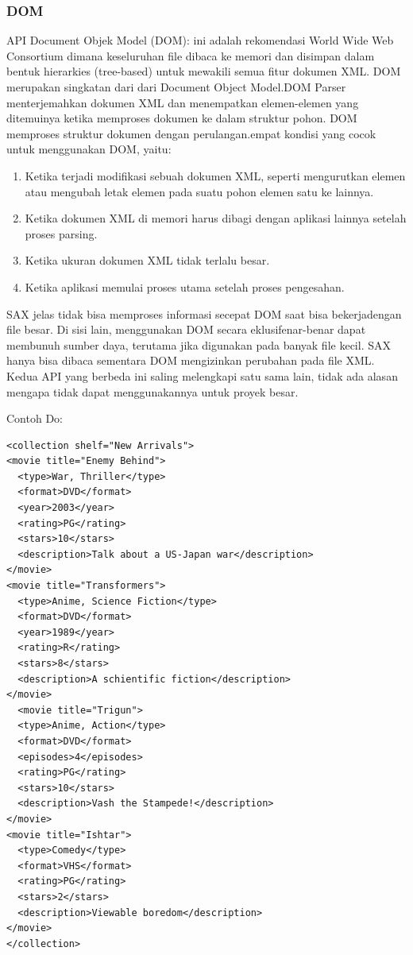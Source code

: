\subsubsection {DOM}
  API Document Objek Model (DOM): ini adalah rekomendasi World Wide Web Consortium dimana keseluruhan file dibaca ke memori dan disimpan dalam bentuk hierarkies (tree-based) untuk mewakili semua fitur dokumen XML. DOM merupakan singkatan dari dari Document Object Model.DOM Parser menterjemahkan dokumen XML dan menempatkan elemen-elemen yang ditemuinya ketika memproses dokumen ke dalam struktur pohon.
  DOM memproses struktur dokumen dengan perulangan.empat kondisi yang cocok untuk menggunakan DOM, yaitu:
\begin{enumerate}
\item Ketika terjadi modifikasi sebuah dokumen XML, seperti mengurutkan elemen atau mengubah letak elemen pada suatu pohon elemen satu ke lainnya.
\item Ketika dokumen XML di memori harus dibagi dengan aplikasi lainnya setelah proses parsing.
\item Ketika ukuran dokumen XML tidak terlalu besar.
\item Ketika aplikasi memulai proses utama setelah proses pengesahan.
\end{enumerate}

SAX jelas tidak bisa memproses informasi secepat DOM saat bisa bekerjadengan file besar. Di sisi lain, menggunakan DOM secara eklusifenar-benar dapat membunuh sumber daya, terutama jika digunakan pada banyak file kecil. SAX hanya bisa dibaca sementara DOM mengizinkan perubahan pada file XML. Kedua API yang berbeda ini saling melengkapi satu sama lain, tidak ada alasan mengapa tidak dapat menggunakannya untuk proyek besar. 

Contoh Do: 
\begin{verbatim}
<collection shelf="New Arrivals"> 
<movie title="Enemy Behind"> 
  <type>War, Thriller</type> 
  <format>DVD</format> 
  <year>2003</year> 
  <rating>PG</rating> 
  <stars>10</stars>
  <description>Talk about a US-Japan war</description> 
</movie> 
<movie title="Transformers"> 
  <type>Anime, Science Fiction</type> 
  <format>DVD</format> 
  <year>1989</year> 
  <rating>R</rating> 
  <stars>8</stars> 
  <description>A schientific fiction</description> 
</movie> 
  <movie title="Trigun"> 
  <type>Anime, Action</type> 
  <format>DVD</format> 
  <episodes>4</episodes>  
  <rating>PG</rating> 
  <stars>10</stars> 
  <description>Vash the Stampede!</description> 
</movie>
<movie title="Ishtar"> 
  <type>Comedy</type> 
  <format>VHS</format> 
  <rating>PG</rating> 
  <stars>2</stars> 
  <description>Viewable boredom</description> 
</movie> 
</collection> 
\end{verbatim}

